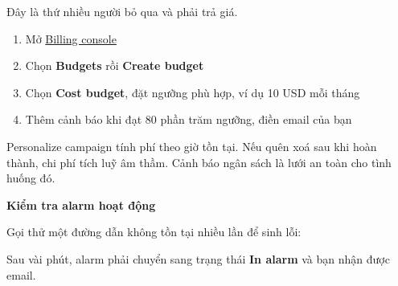 Đây là thứ nhiều người bỏ qua và phải trả giá.

\begin{enumerate}
\def\labelenumi{\arabic{enumi}.}
\tightlist
\item
  Mở
  \href{https://console.aws.amazon.com/billing/home\#/budgets}{Billing
  console}
\item
  Chọn \textbf{Budgets} rồi \textbf{Create budget}
\item
  Chọn \textbf{Cost budget}, đặt ngưỡng phù hợp, ví dụ 10 USD mỗi tháng
\item
  Thêm cảnh báo khi đạt 80 phần trăm ngưỡng, điền email của bạn
\end{enumerate}

Personalize campaign tính phí theo giờ tồn tại. Nếu quên xoá sau khi
hoàn thành, chi phí tích luỹ âm thầm. Cảnh báo ngân sách là lưới an toàn
cho tình huống đó.

\vspace{0.5em}\noindent\textbf{Kiểm tra alarm hoạt
động}\par

Gọi thử một đường dẫn không tồn tại nhiều lần để sinh lỗi:

\begin{Shaded}
\begin{Highlighting}[]
 \DataTypeTok{\{}\DataTypeTok{\}}\KeywordTok{;} 
   \OperatorTok{\textgreater{}}
\end{Highlighting}
\end{Shaded}

Sau vài phút, alarm phải chuyển sang trạng thái \textbf{In alarm} và bạn
nhận được email.
